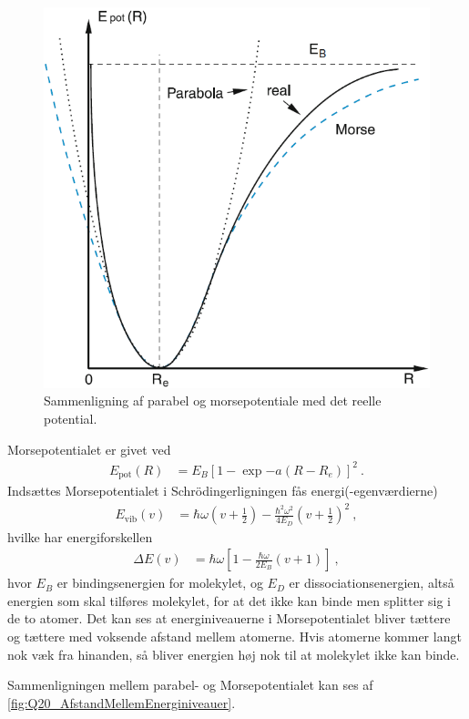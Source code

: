 \begin{figure}[!h]
    \centering
    \includegraphics[width=.6\textwidth]{Q20/images/MorsePotentialComparisonWithOtherPotentials.PNG}
    \caption{Sammenligning af parabel og morsepotentiale med det reelle potential.}
    \label{fig:Q20_ParabelOgMorsePotentiale}
\end{figure}

Morsepotentialet er givet ved
\begin{align}
    E_\text{pot}(R) &= E_B\left[1-\exp{-a\left(R - R_e\right)}\right]^2 \: .
\end{align}
Indsættes Morsepotentialet i Schrödingerligningen fås energi(-egenværdierne)
\begin{align}
    E_\text{vib}(v) &= \hbar\omega\left(v + \frac{1}{2}\right) - \frac{\hbar^2\omega^2}{4E_D}\left(v + \frac{1}{2}\right)^2 \: ,
\end{align}
hvilke har energiforskellen
\begin{align}
    \Delta E (v) &= \hbar\omega \left[1 - \frac{\hbar\omega}{2E_B}(v + 1)\right] \: ,
\end{align}
hvor $E_B$ er bindingsenergien for molekylet, og $E_D$ er \textsf{dissociationsenergien}, altså energien som skal tilføres molekylet, for at det ikke kan binde men splitter sig i de to atomer. Det kan ses at energiniveauerne i Morsepotentialet bliver tættere og tættere med voksende afstand mellem atomerne. Hvis atomerne kommer langt nok væk fra hinanden, så bliver energien høj nok til at molekylet ikke kan binde.

Sammenligningen mellem parabel- og Morsepotentialet kan ses af \cref{fig:Q20_AfstandMellemEnerginiveauer}.

